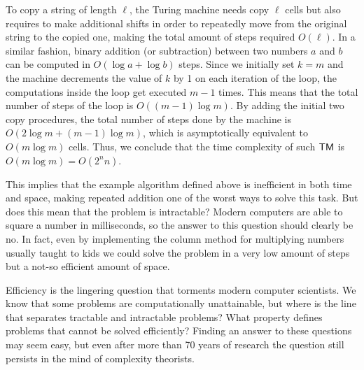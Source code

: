     To copy a string of length $\ell$, the Turing machine needs copy $\ell$ cells but also requires to make additional shifts in order to repeatedly move from the original string to the copied one, making the total amount of steps required $O(\ell)$. In a similar fashion, binary addition (or subtraction) between two numbers $a$ and $b$ can be computed in $O(\log a + \log b)$ steps. Since we initially set $k = m$ and the machine decrements the value of $k$ by 1 on each iteration of the loop, the computations inside the loop get executed $m-1$ times. This means that the total number of steps of the loop is $O((m-1) \log m)$. By adding the initial two copy procedures, the total number of steps done by the machine is $O(2 \log m + (m-1) \log m)$, which is asymptotically equivalent to $O(m \log m)$ cells. Thus, we conclude that the time complexity of such $\textsf{TM}$ is $O(m \log m) = O(2^n n)$.
    
    This implies that the example algorithm defined above is inefficient in both time and space, making repeated addition one of the worst ways to solve this task. But does this mean that the problem is intractable? Modern computers are able to square a number in milliseconds, so the answer to this question should clearly be no. In fact, even by implementing the column method for multiplying numbers usually taught to kids we could solve the problem in a very low amount of steps but a not-so efficient amount of space.

    
    Efficiency is the lingering question that torments modern computer scientists. We know that some problems are computationally unattainable, but where is the line that separates tractable and intractable problems? What property defines problems that cannot be solved efficiently? Finding an answer to these questions may seem easy, but even after more than 70 years of research the question still persists in the mind of complexity theorists.

\cleardoublepage